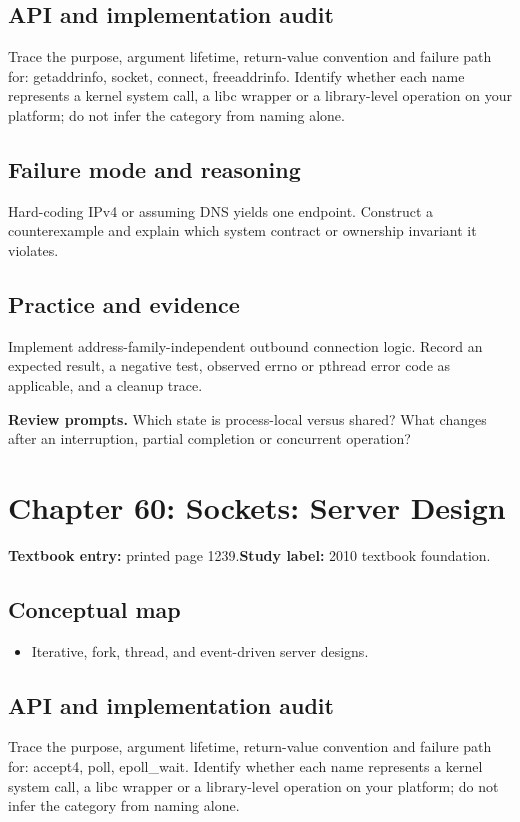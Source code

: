 \documentclass[11pt,letterpaper,oneside]{report}
\begin{document}
\subsection{API and implementation audit}
Trace the purpose, argument lifetime, return-value convention and failure path for: getaddrinfo, socket, connect, freeaddrinfo. Identify whether each name represents a kernel system call, a libc wrapper or a library-level operation on your platform; do not infer the category from naming alone.

\subsection{Failure mode and reasoning}
Hard-coding IPv4 or assuming DNS yields one endpoint. Construct a counterexample and explain which system contract or ownership invariant it violates.

\subsection{Practice and evidence}
Implement address-family-independent outbound connection logic. Record an expected result, a negative test, observed errno or pthread error code as applicable, and a cleanup trace.

\textbf{Review prompts.} Which state is process-local versus shared? What changes after an interruption, partial completion or concurrent operation?

\section{Chapter 60: Sockets: Server Design}
\textbf{Textbook entry:} printed page 1239.\quad \textbf{Study label:} 2010 textbook foundation.

\subsection{Conceptual map}
\begin{itemize}
\item Iterative, fork, thread, and event-driven server designs.
\end{itemize}
\subsection{API and implementation audit}
Trace the purpose, argument lifetime, return-value convention and failure path for: accept4, poll, epoll\_wait. Identify whether each name represents a kernel system call, a libc wrapper or a library-level operation on your platform; do not infer the category from naming alone.
\end{document}
